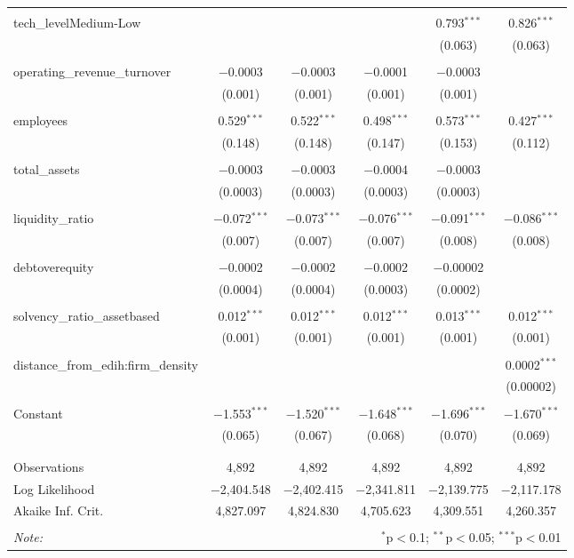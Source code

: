 \begin{table}[!htbp]
\begin{tabular}{@{\extracolsep{5pt}}lccccc}
  & & & & & \\ 
 tech\_levelMedium-Low &  &  &  & 0.793$^{***}$ & 0.826$^{***}$ \\ 
  &  &  &  & (0.063) & (0.063) \\ 
  & & & & & \\ 
 operating\_revenue\_turnover & $-$0.0003 & $-$0.0003 & $-$0.0001 & $-$0.0003 &  \\ 
  & (0.001) & (0.001) & (0.001) & (0.001) &  \\ 
  & & & & & \\ 
 employees & 0.529$^{***}$ & 0.522$^{***}$ & 0.498$^{***}$ & 0.573$^{***}$ & 0.427$^{***}$ \\ 
  & (0.148) & (0.148) & (0.147) & (0.153) & (0.112) \\ 
  & & & & & \\ 
 total\_assets & $-$0.0003 & $-$0.0003 & $-$0.0004 & $-$0.0003 &  \\ 
  & (0.0003) & (0.0003) & (0.0003) & (0.0003) &  \\ 
  & & & & & \\ 
 liquidity\_ratio & $-$0.072$^{***}$ & $-$0.073$^{***}$ & $-$0.076$^{***}$ & $-$0.091$^{***}$ & $-$0.086$^{***}$ \\ 
  & (0.007) & (0.007) & (0.007) & (0.008) & (0.008) \\ 
  & & & & & \\ 
 debtoverequity & $-$0.0002 & $-$0.0002 & $-$0.0002 & $-$0.00002 &  \\ 
  & (0.0004) & (0.0004) & (0.0003) & (0.0002) &  \\ 
  & & & & & \\ 
 solvency\_ratio\_assetbased & 0.012$^{***}$ & 0.012$^{***}$ & 0.012$^{***}$ & 0.013$^{***}$ & 0.012$^{***}$ \\ 
  & (0.001) & (0.001) & (0.001) & (0.001) & (0.001) \\ 
  & & & & & \\ 
 distance\_from\_edih:firm\_density &  &  &  &  & 0.0002$^{***}$ \\ 
  &  &  &  &  & (0.00002) \\ 
  & & & & & \\ 
 Constant & $-$1.553$^{***}$ & $-$1.520$^{***}$ & $-$1.648$^{***}$ & $-$1.696$^{***}$ & $-$1.670$^{***}$ \\ 
  & (0.065) & (0.067) & (0.068) & (0.070) & (0.069) \\ 
  & & & & & \\ 
\hline \\[-1.8ex] 
Observations & 4,892 & 4,892 & 4,892 & 4,892 & 4,892 \\ 
Log Likelihood & $-$2,404.548 & $-$2,402.415 & $-$2,341.811 & $-$2,139.775 & $-$2,117.178 \\ 
Akaike Inf. Crit. & 4,827.097 & 4,824.830 & 4,705.623 & 4,309.551 & 4,260.357 \\ 
\hline 
\hline \\[-1.8ex] 
\textit{Note:}  & \multicolumn{5}{r}{$^{*}$p$<$0.1; $^{**}$p$<$0.05; $^{***}$p$<$0.01} \\ 
\end{tabular} 
\end{table} 
